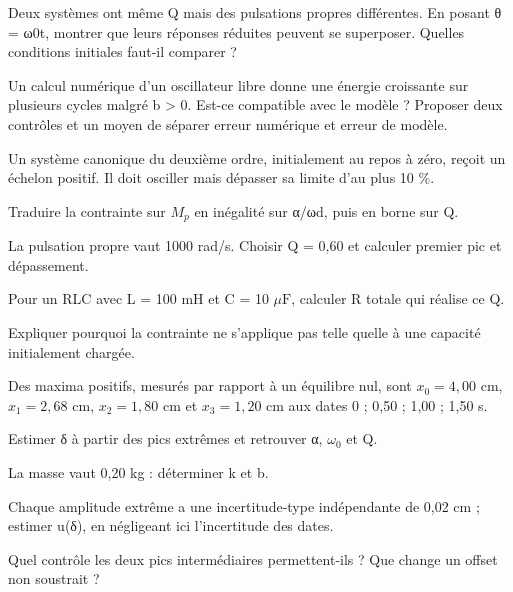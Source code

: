 \begin{questions}
\item Deux systèmes ont même Q mais des pulsations propres différentes. En posant θ = ω0t, montrer que leurs réponses réduites peuvent se superposer. Quelles conditions initiales faut-il comparer ?
\end{questions}

\begin{questions}
\item Un calcul numérique d’un oscillateur libre donne une énergie croissante sur plusieurs cycles malgré b > 0. Est-ce compatible avec le modèle ? Proposer deux contrôles et un moyen de séparer erreur numérique et erreur de modèle.
\end{questions}



\label{ex-D1}
Un système canonique du deuxième ordre, initialement au repos à zéro, reçoit un échelon positif. Il doit osciller mais dépasser sa limite d’au plus 10 \%.\begin{questions}
\item Traduire la contrainte sur $M_p$ en inégalité sur α/ωd, puis en borne sur Q.
\item La pulsation propre vaut 1000 rad/s. Choisir Q = 0,60 et calculer premier pic et dépassement.
\item Pour un RLC avec L = 100 mH et C = 10 $\mu\mathrm{ F}$, calculer R totale qui réalise ce Q.
\item Expliquer pourquoi la contrainte ne s’applique pas telle quelle à une capacité initialement chargée.
\end{questions}


\label{ex-D2}
Des maxima positifs, mesurés par rapport à un équilibre nul, sont $x_0=4{,}00$ cm, $x_1=2{,}68$ cm, $x_2=1{,}80$ cm et $x_3=1{,}20$ cm aux dates 0 ; 0,50 ; 1,00 ; 1,50 s.\begin{questions}
\item Estimer δ à partir des pics extrêmes et retrouver α, $\omega_0$ et Q.
\item La masse vaut 0,20 kg : déterminer k et b.
\item Chaque amplitude extrême a une incertitude-type indépendante de 0,02 cm ; estimer u(δ), en négligeant ici l’incertitude des dates.
\item Quel contrôle les deux pics intermédiaires permettent-ils ? Que change un offset non soustrait ?
\end{questions}


